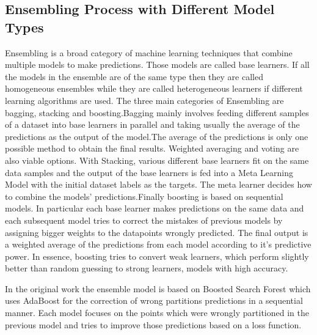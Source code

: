 \documentclass[sigconf, nonacm]{acmart}
\begin{document}
\subsection{Ensembling Process with Different Model Types}
Ensembling is a broad category of machine learning techniques that combine multiple models to make predictions. Those models are called base learners. If all the models in the ensemble are of the same type then they are called homogeneous ensembles while they are called heterogeneous learners if different learning algorithms are used. The three main categories of Ensembling are bagging, stacking and boosting.Bagging mainly involves feeding different samples of a dataset into base learners in parallel and taking usually the average of the predictions as the output of the model.The average of the predictions is only one possible method to obtain the final results. Weighted averaging and voting are also viable options. With Stacking, various different base learners fit on the same data samples and the output of the base learners is fed into a Meta Learning Model with the initial dataset labels as the targets. The meta learner decides how to combine the models' predictions.Finally boosting\cite{boosting} is based on sequential models. In particular each base learner makes predictions on the same data and each subsequent model tries to correct the mistakes of previous models by assigning bigger weights to the datapoints wrongly predicted. The final output is a weighted average of the predictions from each model according to it's predictive power. In essence, boosting tries to convert weak learners, which perform slightly better than random guessing to strong learners, models with high accuracy\cite{ensembling}. 

In the original work the ensemble model is based on  Boosted Search Forest\cite{bforest} which uses AdaBoost\cite{adaboost} for the correction of wrong partitions predictions in a sequential manner. Each model focuses on the points which were wrongly partitioned in the previous model and tries to improve those predictions based on a loss function.
\end{document}
